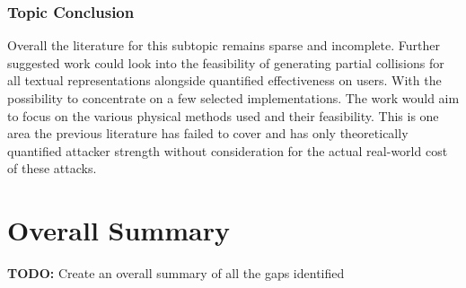 \subsubsection{Topic Conclusion}
Overall the literature for this subtopic remains sparse and incomplete. Further suggested work could look into the feasibility of generating partial collisions for all textual representations alongside quantified effectiveness on users. With the possibility to concentrate on a few selected implementations. The work would aim to focus on the various physical methods used and their feasibility. This is one area the previous literature has failed to cover and has only theoretically quantified attacker strength without consideration for the actual real-world cost of these attacks.

\section{Overall Summary}

\textbf{TODO: } Create an overall summary of all the gaps identified